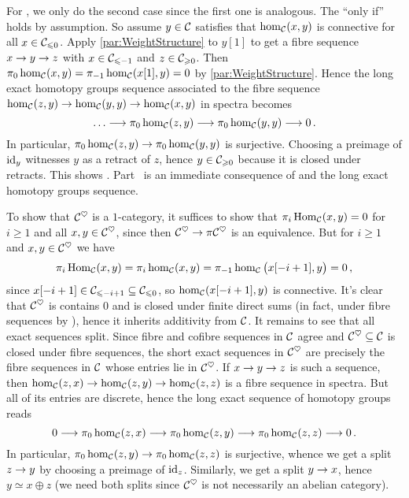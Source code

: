 \documentclass[a4paper, 10pt, oneside, DIV=9, chapterprefix=true, numbers=enddot,bibliography=totoc]{scrbook}
\begin{document}
\begin{proof*}
	For , we only do the second case since the first one is analogous. The \enquote{only if} holds by assumption. So assume $y\in\mathcal{C}$ satisfies that $\hom_{\mathcal{C}}(x,y)$ is connective for all $x\in \mathcal{C}_{\leqslant 0}$. Apply \cref{par:WeightStructure} to $y[1]$ to get a fibre sequence $x\morphism y\morphism z$ with $x\in \mathcal{C}_{\leqslant -1}$ and $z\in \mathcal{C}_{\geqslant 0}$. Then $\pi_0\hom_{\mathcal{C}}(x,y)=\pi_{-1}\hom_{\mathcal{C}}(x[1],y)=0$ by \cref{par:WeightStructure}. Hence the long exact homotopy groups sequence associated to the fibre sequence $\hom_\Cc(z,y)\morphism \hom_\Cc(y,y)\morphism\hom_\Cc(x,y)$ in spectra becomes
	\begin{equation*}
		\dotso\morphism \pi_0\hom_\Cc(z,y)\morphism \pi_0\hom_\Cc(y,y)\morphism 0\,.
	\end{equation*}
	In particular, $\pi_0\hom_\Cc(z,y)\morphism \pi_0\hom_\Cc(y,y)$ is surjective. Choosing a preimage of $\operatorname{id}_y$ witnesses $y$ as a retract of $z$, hence $y\in \mathcal{C}_{\geqslant 0}$ because it is closed under retracts. This shows . Part~ is an immediate consequence of  and the long exact homotopy groups sequence.
	
	To show that $\mathcal{C}^\heartsuit$ is a $1$-category, it suffices to show that $\pi_i\operatorname{Hom}_{\mathcal{C}}(x,y)=0$ for $i\geq 1$ and all $x,y\in \mathcal{C}^\heartsuit$, since then $\Cc^\heartsuit\morphism \pi\Cc^\heartsuit$ is an equivalence. But for $i\geq1$ and $x,y\in \mathcal{C}^\heartsuit$ we have
	\begin{equation*}
		\pi_i\operatorname{Hom}_{\mathcal{C}}(x,y)=\pi_i\hom_{\mathcal{C}}(x,y)=\pi_{-1}\hom_{\mathcal{C}}\big(x[-i+1],y\big)=0\,,
	\end{equation*}
	since $x[-i+1]\in \mathcal{C}_{\leqslant -i+1}\subseteq \mathcal{C}_{\leqslant 0}$, so $\hom_{\mathcal{C}}(x[-i+1],y)$ is connective. It's clear that $\mathcal{C}^\heartsuit$ is contains $0$ and is closed under finite direct sums (in fact, under fibre sequences by ), hence it inherits additivity from $\mathcal{C}$. It remains to see that all exact sequences split. Since fibre and cofibre sequences in $\mathcal{C}$ agree and $\mathcal{C}^\heartsuit\subseteq \mathcal{C}$ is closed under fibre sequences, the short exact sequences in $\mathcal{C}^\heartsuit$ are precisely the fibre sequences in $\mathcal{C}$ whose entries lie in $\mathcal{C}^\heartsuit$. If $x\morphism y\morphism z$ is such a sequence, then $\hom_\Cc(z,x)\morphism \hom_\Cc(z,y)\morphism\hom_\Cc(z,z)$ is a fibre sequence in spectra. But all of its entries are discrete, hence the long exact sequence of homotopy groups reads
	\begin{equation*}
		0\morphism \pi_0\hom_\Cc(z,x)\morphism \pi_0\hom_\Cc(z,y)\morphism \pi_0\hom_\Cc(z,z)\morphism 0\,.
	\end{equation*}
	In particular, $\pi_0\hom_\Cc(z,y)\morphism \pi_0\hom_\Cc(z,z)$ is surjective, whence we get a split $z\morphism y$ by choosing a preimage of $\operatorname{id}_z$. Similarly, we get a split $y\morphism x$, hence $y\simeq x\oplus z$ (we need both splits since $\mathcal{C}^\heartsuit$ is not necessarily an abelian category).
\end{proof*}
\end{document}
